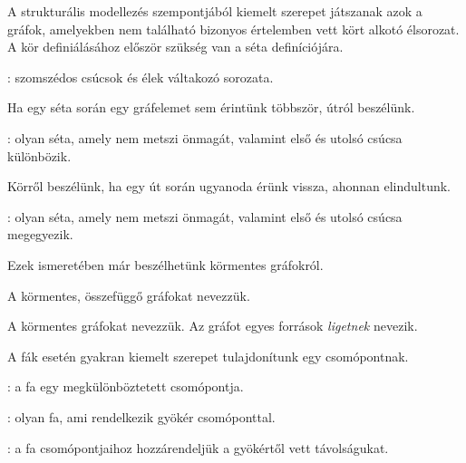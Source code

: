 A strukturális modellezés szempontjából kiemelt szerepet játszanak azok a gráfok, amelyekben nem található bizonyos értelemben vett kört alkotó élsorozat. A kör definiálásához először szükség van a séta definíciójára.

\begin{definicio}
	: szomszédos csúcsok és élek váltakozó sorozata.
\end{definicio}

Ha egy séta során egy gráfelemet sem érintünk többször, útról beszélünk.

\begin{definicio}
: olyan séta, amely nem metszi önmagát, valamint első és utolsó csúcsa különbözik.
\end{definicio}

Körről beszélünk, ha egy út során ugyanoda érünk vissza, ahonnan elindultunk.

\begin{definicio}
: olyan séta, amely nem metszi önmagát, valamint első és utolsó csúcsa megegyezik.
\end{definicio}

Ezek ismeretében már beszélhetünk körmentes gráfokról.

\begin{definicio}
	A körmentes, összefüggő gráfokat  nevezzük.
\end{definicio}

\begin{definicio}
	A körmentes gráfokat  nevezzük. Az  gráfot egyes források \emph{ligetnek} nevezik.
\end{definicio}

A fák esetén gyakran kiemelt szerepet tulajdonítunk egy csomópontnak.

\begin{definicio}
	: a fa egy megkülönböztetett csomópontja.
\end{definicio}

\begin{definicio}
	: olyan fa, ami rendelkezik gyökér csomóponttal.
\end{definicio}

\begin{definicio}
	: a fa csomópontjaihoz hozzárendeljük a gyökértől vett távolságukat.
\end{definicio}


